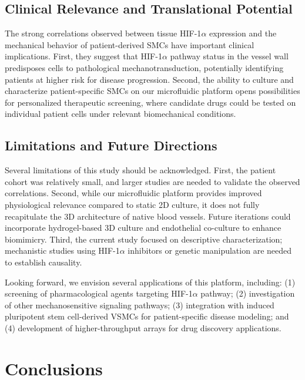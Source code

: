 \documentclass[materials,article,submit,moreauthors,pdftex]{Definitions/mdpi}
\begin{document}
\subsection{Clinical Relevance and Translational Potential}

The strong correlations observed between tissue HIF-1$\alpha$ expression and the mechanical behavior of patient-derived SMCs have important clinical implications. First, they suggest that HIF-1$\alpha$ pathway status in the vessel wall predisposes cells to pathological mechanotransduction, potentially identifying patients at higher risk for disease progression. Second, the ability to culture and characterize patient-specific SMCs on our microfluidic platform opens possibilities for personalized therapeutic screening, where candidate drugs could be tested on individual patient cells under relevant biomechanical conditions.

\subsection{Limitations and Future Directions}

Several limitations of this study should be acknowledged. First, the patient cohort was relatively small, and larger studies are needed to validate the observed correlations. Second, while our microfluidic platform provides improved physiological relevance compared to static 2D culture, it does not fully recapitulate the 3D architecture of native blood vessels. Future iterations could incorporate hydrogel-based 3D culture and endothelial co-culture to enhance biomimicry. Third, the current study focused on descriptive characterization; mechanistic studies using HIF-1$\alpha$ inhibitors or genetic manipulation are needed to establish causality.

Looking forward, we envision several applications of this platform, including: (1) screening of pharmacological agents targeting HIF-1$\alpha$ pathway; (2) investigation of other mechanosensitive signaling pathways; (3) integration with induced pluripotent stem cell-derived VSMCs for patient-specific disease modeling; and (4) development of higher-throughput arrays for drug discovery applications.

\section{Conclusions}
\end{document}
